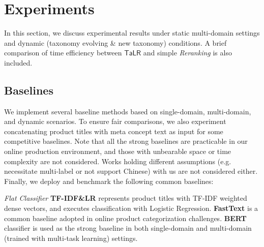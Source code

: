 \section{Experiments}
In this section, 
we discuss experimental results under static multi-domain settings and dynamic (taxonomy evolving \& new taxonomy) conditions. A brief comparison of time efficiency between $\mathsf{TaLR}$ and simple \textit{Reranking} is also included.


\subsection{Baselines}
\label{sec: baseline}
We implement several baseline methods based on single-domain, multi-domain, and dynamic scenarios. 
To ensure fair comparisons, we also experiment concatenating product titles with meta concept text as input for some competitive baselines.
Note that all the strong baselines are practicable in our online production environment, and those with unbearable space or time complexity are not considered. 
Works holding different assumptions (e.g. necessitate multi-label or not support Chinese) with us are not considered either. 
Finally, we deploy and benchmark the following common baselines: 

\textit{Flat Classifier} \textbf{TF-IDF\&LR} represents product titles with TF-IDF weighted dense vectors, and executes classification with Logistic Regression. \textbf{FastText} \cite{bojanowski2017enriching} is a common baseline adopted in online product categorization challenges. 
\textbf{BERT} classifier is used as the strong baseline in both single-domain and multi-domain (trained with multi-task learning) settings.

